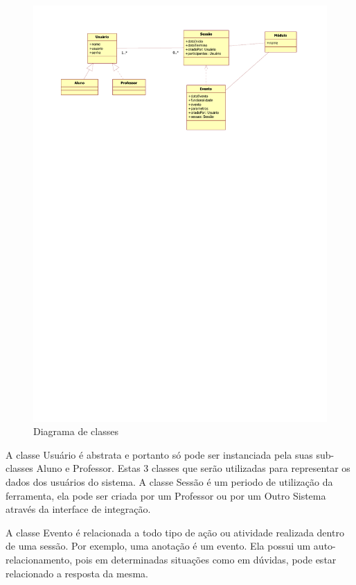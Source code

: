 \begin{figure}[!h]
\centering
\includegraphics[width=1.0\textwidth]{pdfs/img-class-diagram.pdf} 
\caption{Diagrama de classes}
\label{fig:class_diagram} 
\end{figure}

A classe Usuário é abstrata e portanto só pode ser instanciada pela suas sub-classes Aluno e Professor. Estas 3 classes que serão utilizadas para representar os dados dos usuários do sistema. A classe Sessão é um periodo de utilização da ferramenta, ela pode ser criada por um Professor ou por um Outro Sistema através da interface de integração.

A classe Evento é relacionada a todo tipo de ação ou atividade realizada dentro de uma sessão. Por exemplo, uma anotação é um evento. Ela possui um auto-relacionamento, pois em determinadas situações como em dúvidas,  pode estar relacionado a resposta da mesma.

